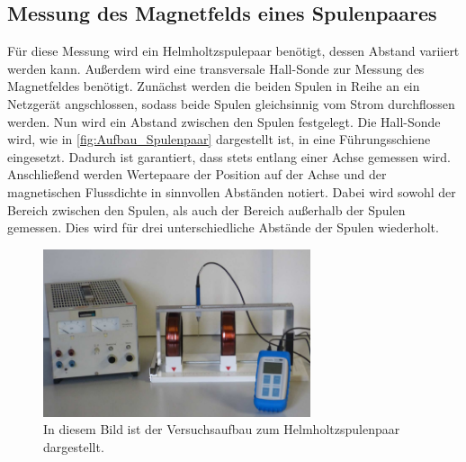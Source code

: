 \subsection{Messung des Magnetfelds eines Spulenpaares}
\label{subsec:D_Spulenpaar}
Für diese Messung wird ein Helmholtzspulepaar benötigt, dessen Abstand variiert werden kann. Außerdem wird eine transversale Hall-Sonde zur Messung des Magnetfeldes benötigt. Zunächst
werden die beiden Spulen in Reihe an ein Netzgerät angschlossen, sodass beide Spulen gleichsinnig vom Strom durchflossen werden. Nun wird ein Abstand zwischen den Spulen 
festgelegt. Die Hall-Sonde wird, wie in \autoref{fig:Aufbau_Spulenpaar} dargestellt ist, in eine Führungsschiene eingesetzt. Dadurch ist garantiert, dass stets entlang einer Achse
gemessen wird.
Anschließend werden Wertepaare der Position auf der Achse und der magnetischen Flussdichte in sinnvollen Abständen notiert. Dabei wird sowohl der Bereich zwischen den Spulen, 
als auch der Bereich außerhalb der Spulen gemessen. Dies wird für drei unterschiedliche Abstände der Spulen wiederholt.
\begin{figure}
    \centering
    \caption{In diesem Bild ist der Versuchsaufbau zum Helmholtzspulenpaar dargestellt.\cite{v308}}
    \label{fig:Aufbau_Spulenpaar}
    \includegraphics[width=0.7\textwidth]{content/HelmHoltzAufbau.PNG}
\end{figure}
